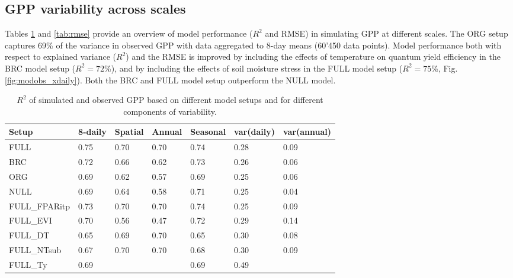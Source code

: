 \documentclass{myreport}
\begin{document}
\subsection{GPP variability across scales}
\label{sec:results_gpp}


Tables \ref{tab:rsq} and \ref{tab:rmse} provide an overview of model performance ($R^2$ and RMSE) in simulating GPP at different scales. The ORG setup captures 69\% of the variance in observed GPP with data aggregated to 8-day means (60’450 data points). Model performance both with respect to explained variance ($R^2$) and the RMSE is improved by including the effects of temperature on quantum yield efficiency in the BRC model setup  ($R^2 = 72$\%), and by including the effects of soil moisture stress in the FULL model setup ($R^2 = 75$\%, Fig. \ref{fig:modobs_xdaily}). Both the BRC and FULL model setup outperform the NULL model.

\begin{table}
\caption{$R^2$ of simulated and observed GPP based on different model setups and for different components of variability.} 
\begin{tabular}{lllllll}
  \toprule
  Setup & 8-daily & Spatial & Annual & Seasonal & var(daily) & var(annual) \\ 
  \midrule
  FULL & 0.75 & 0.70 & 0.70 & 0.74 & 0.28 & 0.09 \\ 
  BRC & 0.72 & 0.66 & 0.62 & 0.73 & 0.26 & 0.06 \\ 
  ORG & 0.69 & 0.62 & 0.57 & 0.69 & 0.25 & 0.06 \\ 
  NULL & 0.69 & 0.64 & 0.58 & 0.71 & 0.25 & 0.04 \\ 
  \midrule
  FULL\_FPARitp & 0.73 & 0.70 & 0.70 & 0.74 & 0.25 & 0.09 \\ 
  FULL\_EVI & 0.70 & 0.56 & 0.47 & 0.72 & 0.29 & 0.14 \\ 
  \midrule
  FULL\_DT & 0.65 & 0.69 & 0.70 & 0.65 & 0.30 & 0.08 \\ 
  FULL\_NTsub & 0.67 & 0.70 & 0.70 & 0.68 & 0.30 & 0.09 \\ 
  FULL\_Ty & 0.69 &  &  & 0.69 & 0.49 & \\ 
  \bottomrule
  \end{tabular}
\label{tab:rsq}
\end{table}
\end{document}
